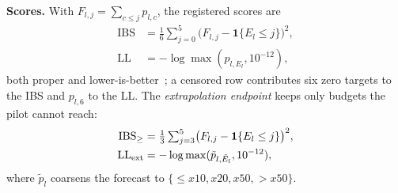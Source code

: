 \textbf{Scores.} With $F_{l,j}=\sum_{c\le j}p_{l,c}$, the registered scores are
\begin{equation}
\begin{aligned}
\mathrm{IBS}&=\tfrac16\textstyle\sum_{j=0}^{5}\bigl(F_{l,j}-\mathbf 1\{E_l\le j\}\bigr)^2,\\
\mathrm{LL}&=-\log\max(p_{l,E_l},10^{-12}),
\end{aligned}
\label{eq:scores}
\end{equation}
both proper and lower-is-better~\cite{gneiting2007strictly}; a censored row contributes six zero targets to the IBS and $p_{l,6}$ to the LL. The \emph{extrapolation endpoint} keeps only budgets the pilot cannot reach:
\begin{equation}
\begin{aligned}
\mathrm{IBS}_{\ge}&=\tfrac13\textstyle\sum_{j=3}^{5}\bigl(F_{l,j}-\mathbf 1\{E_l\le j\}\bigr)^2,\\
\mathrm{LL}_{\rm ext}&=-\log\max(\tilde p_{l,\tilde E_l},10^{-12}),
\end{aligned}
\label{eq:ext}
\end{equation}
where $\tilde p_l$ coarsens the forecast to $\{\le x10, x20, x50, >x50\}$.


